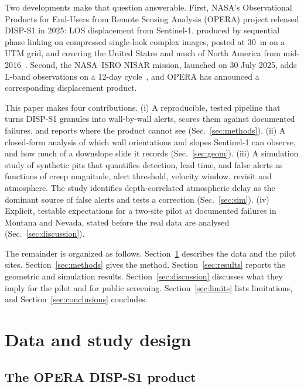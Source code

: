 \documentclass[aps,prd,twocolumn,superscriptaddress,nofootinbib,floatfix,preprintnumbers,10pt]{revtex4-2}
\begin{document}
Two developments make that question answerable. First, NASA's Observational Products for End-Users from Remote Sensing Analysis (OPERA) project released DISP-S1 in 2025: LOS displacement from Sentinel-1, produced by sequential phase linking on compressed single-look complex images, posted at 30~m on a UTM grid, and covering the United States and much of North America from mid-2016~\cite{OperaDISP,OperaRelease2025,OperaATBD2025,Staniewicz2025,Staniewicz2024}. Second, the NASA--ISRO NISAR mission, launched on 30 July 2025, adds L-band observations on a 12-day cycle~\cite{ISRONISAR}, and OPERA has announced a corresponding displacement product.

This paper makes four contributions. (i) A reproducible, tested pipeline that turns DISP-S1 granules into wall-by-wall alerts, scores them against documented failures, and reports where the product cannot see (Sec.~\ref{sec:methods}). (ii) A closed-form analysis of which wall orientations and slopes Sentinel-1 can observe, and how much of a downslope slide it records (Sec.~\ref{sec:geom}). (iii) A simulation study of \NReal{} synthetic pits that quantifies detection, lead time, and false alerts as functions of creep magnitude, alert threshold, velocity window, revisit and atmosphere. The study identifies depth-correlated atmospheric delay as the dominant source of false alerts and tests a correction (Sec.~\ref{sec:sim}). (iv) Explicit, testable expectations for a two-site pilot at documented failures in Montana and Nevada, stated before the real data are analysed (Sec.~\ref{sec:discussion}).

The remainder is organized as follows. Section~\ref{sec:data} describes the data and the pilot sites. Section~\ref{sec:methods} gives the method. Section~\ref{sec:results} reports the geometric and simulation results. Section~\ref{sec:discussion} discusses what they imply for the pilot and for public screening. Section~\ref{sec:limits} lists limitations, and Section~\ref{sec:conclusions} concludes.

\section{Data and study design}\label{sec:data}

\subsection{The OPERA DISP-S1 product}
\end{document}

